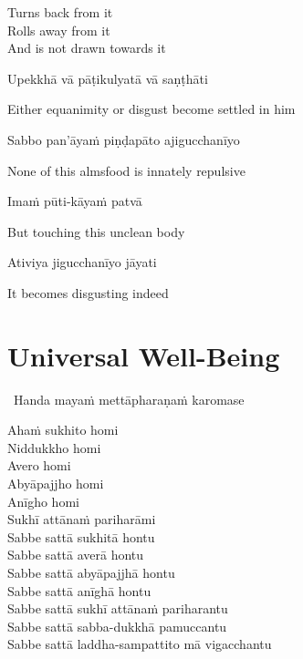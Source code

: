 \begin{english-verses}
  Turns back from it\\
  Rolls away from it\\
  And is not drawn towards it
\end{english-verses}

Upekkhā vā pāṭikulyatā vā saṇṭhāti

\begin{english}
  Either equanimity or disgust become settled in him
\end{english}

\suttaRef{[AN 7.49]}

Sabbo pan'āyaṁ piṇḍapāto ajigucchanīyo

\begin{english}
  None of this almsfood is innately repulsive
\end{english}

\ifninebythirteenversion\clearpage\fi

Imaṁ pūti-kāyaṁ patvā

\begin{english}
  But touching this unclean body
\end{english}

Ativiya jigucchanīyo jāyati

\begin{english}
  It becomes disgusting indeed
\end{english}

\suttaRef{[Trad]}

\ifdigitalversion{}\fi



\section{Universal Well-Being}
\label{universal-well-being}

\begin{leader}
  \anglebracketleft\ \hspace{-0.5mm}Handa mayaṁ mettāpharaṇaṁ karomase \hspace{-0.5mm}\anglebracketright\
\end{leader}

Ahaṁ sukhito homi\\
Niddukkho homi\\
Avero homi\\
Abyāpajjho homi\\
Anīgho homi\\
Sukhī attānaṁ pariharāmi\\
Sabbe sattā sukhitā hontu\\
Sabbe sattā averā hontu\\
Sabbe sattā abyāpajjhā hontu\\
Sabbe sattā anīghā hontu\\
Sabbe sattā sukhī attānaṁ pariharantu\\
Sabbe sattā sabba-dukkhā pamuccantu\\
Sabbe sattā laddha-sampattito mā vigacchantu

